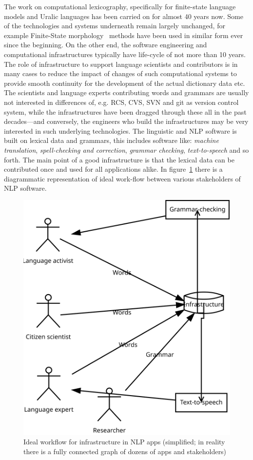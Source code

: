 \documentclass[free]{flammie}
\begin{document}
The work on computational lexicography, specifically for finite-state language models and Uralic languages has been carried on for almost 40 years now.
Some of the technologies and systems underneath remain largely unchanged, for example Finite-State morphology~\cite{beesley2003finite} methods have been used in similar form ever since the beginning.
On the other end, the software engineering and computational infrastructures typically have life-cycle of not more than 10 years.
The role of infrastructure to support language scientists and contributors is in many cases to reduce the impact of changes of such computational systems to provide smooth continuity for the development of the actual dictionary data etc.
The scientists and language experts contributing words and grammars are usually not interested in differences of, e.g. RCS, CVS, SVN and git as version control system, while the infrastructures have been dragged through these all in the past decades---and conversely, the engineers who build the infrastructures may be very interested in such underlying technologies.
The linguistic and NLP software is built on lexical data and grammars, this includes software like:
\textit{machine translation}, \textit{spell-checking and correction}, \textit{grammar checking}, \textit{text-to-speech} and so forth.
The main point of a good infrastructure is that the lexical data can be contributed once and used for all applications alike.
In figure~\ref{fig:infra} there is a diagrammatic representation of ideal work-flow between various stakeholders of NLP software.

\begin{figure}
    \centering
    \includegraphics[width=.9\textwidth]{infra-diagram}
    \caption{Ideal workflow for infrastructure in NLP apps
    (simplified; in reality there is a fully connected graph of dozens of apps and stakeholders)
    \label{fig:infra}}
\end{figure}
\end{document}
